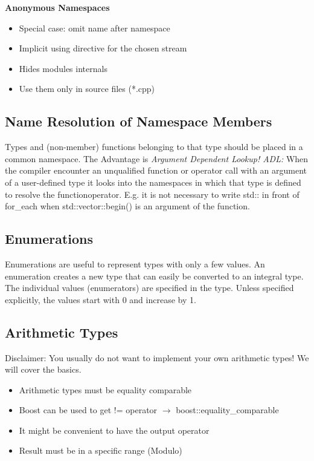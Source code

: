 \textbf{Anonymous Namespaces}
\begin{itemize}
  \itemsep -0.5em 
  \item Special case: omit name after namespace
  \item Implicit using directive for the chosen stream
  \item Hides modules internals
  \item Use them only in source files (*.cpp)
\end{itemize}


\subsection{Name Resolution of Namespace Members}
Types and (non-member) functions belonging to that type should be placed in a common namespace. The Advantage is \textit{Argument Dependent Lookup! ADL:} When the compiler encounter an unqualified function or operator call with an argument of a user-defined type it looks into the namespaces in which that type is defined to resolve the function\/operator. E.g. it is not necessary to write std:: in front of for\_each when std::vector::begin() is an argument of the function.


\subsection{Enumerations}
Enumerations are useful to represent types with only a few values. An enumeration creates a new type that can easily be converted to an integral type.  The individual values (enumerators) are specified in the type. Unless specified explicitly, the values start with 0 and increase by 1.


\subsection{Arithmetic Types}
Disclaimer: You usually do not want to implement your own arithmetic types! We will cover the basics.

\begin{itemize}
	\itemsep -0.5em
    \item Arithmetic types must be equality comparable
    \item Boost can be used to get != operator $\rightarrow$ boost::equality\_comparable
    \item It might be convenient to have the output operator
    \item Result must be in a specific range (Modulo)
\end{itemize}


\pagebreak